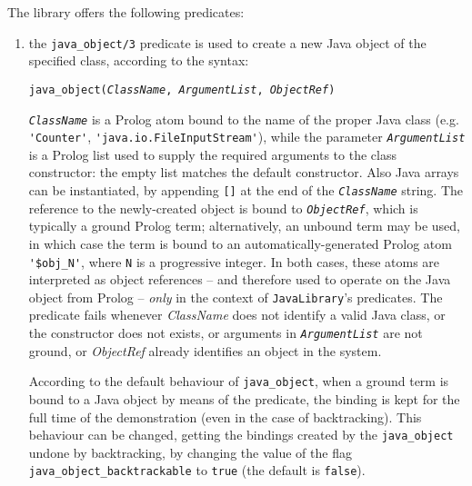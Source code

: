 The library offers the following predicates:
%
\begin{enumerate}
  \renewcommand\labelenumi{\it(\roman{enumi})}
  \item the \texttt{java\_object/3} predicate is used to create a new Java
        object of the specified class, according to the syntax:
        \begin{center}
        \texttt{java\_object(\textit{ClassName},
                             \textit{ArgumentList},
                             \textit{ObjectRef})}
        \end{center}
        \texttt{\textit{ClassName}} is a Prolog atom bound to the name of the
        proper Java class (e.g. \verb|'Counter'|, \verb|'java.io.FileInputStream'|),
        while the parameter \texttt{\textit{ArgumentList}} is a Prolog list used to supply
        the required arguments to the class
        constructor: the empty list matches the default constructor.
        Also Java arrays can be instantiated, by appending
        \texttt{[]} at the end of the \texttt{\textit{ClassName}}
        string.
        The reference to the newly-created object is bound to \texttt{\textit{ObjectRef}},
        which is typically a ground Prolog term; alternatively, an unbound term
        may be used, in which case the term is bound to an automatically-generated
        Prolog atom \verb|'$obj_N'|, where \texttt{N} is a progressive integer.
        In both cases, these atoms are interpreted as object references --
        and therefore used to operate on the Java object from Prolog -- \textit{only}
        in the context of \texttt{JavaLibrary}'s predicates.
        The predicate fails whenever \textit{ClassName} does not identify a valid Java class,
        or the constructor does not exists, or arguments in
        \texttt{\textit{ArgumentList}} are not ground, or \textit{ObjectRef}
        already identifies an object in the system.

        According to the default behaviour of \texttt{java\_object},
        when a ground term is bound to a Java object by means of the predicate,
        the binding is kept for the full time of the demonstration
        (even in the case of backtracking).
        This behaviour can be changed, getting the bindings
        created by the \texttt{java\_object} undone by
        backtracking, by changing the value of the flag \texttt{java\_object\_backtrackable}
        to \texttt{true} (the default is \texttt{false}).




\end{enumerate}
